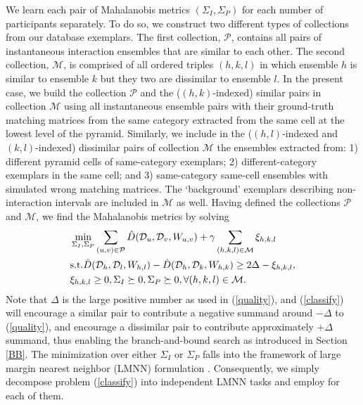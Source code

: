 We learn each pair of Mahalanobis metrics $(\Sigma_{I}, \Sigma_{P})$ for each number of participants separately. To do so, we construct two different types of collections from our database exemplars. The first collection, $\mathcal{P}$, contains all pairs of instantaneous interaction ensembles that are similar to each other. The second collection, $\mathcal{M}$, is comprised of all ordered triples $(h,k,l)$ in which ensemble $h$ is similar to ensemble $k$ but they two  are dissimilar to ensemble $l$. In the present case, we build the collection $\mathcal{P}$ and the ($(h,k)$-indexed) similar pairs in collection $\mathcal{M}$ using all instantaneous ensemble pairs with their ground-truth matching matrices from the same category extracted from the same cell at the lowest level of the pyramid. Similarly, we include in the ($(h,l)$-indexed and $(k,l)$-indexed) dissimilar pairs  of collection $\mathcal{M}$ the ensembles extracted from: 1) different pyramid cells of same-category exemplars; 2) different-category exemplars in the same cell; and 3) same-category same-cell ensembles with simulated wrong matching matrices. The `background' exemplars describing non-interaction intervals are included in $\mathcal{M}$ as well. Having defined the collections $\mathcal{P}$ and $\mathcal{M}$, we find the Mahalanobis metrics by solving
\begin{equation}
\label{classify}
\begin{split}
&\min_{\Sigma_{I},\Sigma_{P}} \sum_{(u,v)\in\mathcal{P}}\hat{D}(\mathcal{D}_{u}, \mathcal{D}_{v}, W_{u,v})+\gamma\sum_{(h,k,l)\in\mathcal{M}}\xi_{h,k,l}\\
&\textup{s.t.}  \hat{D}(\mathcal{D}_{h}, \mathcal{D}_{l}, W_{h,l})-\hat{D}(\mathcal{D}_{h}, \mathcal{D}_{k}, W_{h,k})\ge 2\Delta-\xi_{h,k,l}, \\
&\xi_{h,k,l}\ge0, \Sigma_{I}\succeq 0, \Sigma_{P}\succeq 0, \forall (h,k,l)\in\mathcal{M}.
\end{split}
\end{equation}
Note that $\Delta$ is the large positive number as used in (\ref{quality}), and (\ref{classify}) will encourage a similar pair to contribute a negative summand around $-\Delta$ to (\ref{quality}), and encourage a dissimilar pair to contribute approximately $+\Delta$ summand,  thus enabling the branch-and-bound search as introduced in Section \ref{BB}.  The minimization over either $\Sigma_{I}$ or $\Sigma_{P}$ falls into the framework of large margin nearest neighbor (LMNN) formulation \cite{Weinberger:ML}. Consequently, we simply decompose problem (\ref{classify}) into independent LMNN tasks and employ \cite{Weinberger:ML} for each of them.

